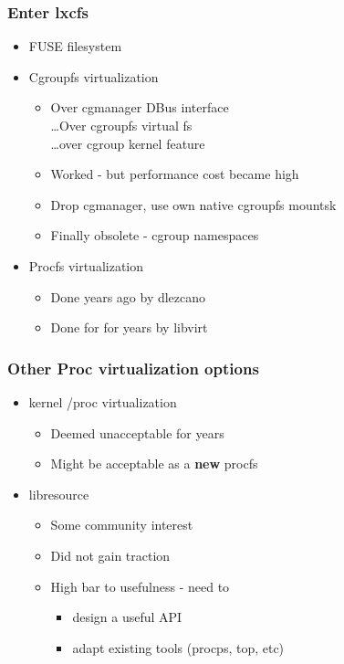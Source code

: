 \documentclass{beamer}
\begin{document}
\begin{frame}[fragile]
\frametitle{Enter lxcfs}
	\begin{itemize}
	\item FUSE filesystem
	\item Cgroupfs virtualization
		\begin{itemize}
		\item Over cgmanager DBus interface \\
			\ldots Over cgroupfs virtual fs \\
			\ldots over cgroup kernel feature
		\item Worked - but performance cost became high
		\pause
		\item Drop cgmanager, use own native cgroupfs mountsk
		\pause
		\item Finally obsolete - cgroup namespaces
		\end{itemize}
	\pause
	\item Procfs virtualization
		\begin{itemize}
		\item Done years ago by dlezcano
		\item Done for for years by libvirt
		\end{itemize}
	\end{itemize}
\end{frame}

\begin{frame}
\frametitle{Other Proc virtualization options}
\begin{itemize}
\item kernel /proc virtualization
	\begin{itemize}
	\item Deemed unacceptable for years
	\item Might be acceptable as a {\bf new} procfs
	\end{itemize}
\item libresource
	\begin{itemize}
	\item Some community interest
	\item Did not gain traction
	\item High bar to usefulness - need to
		\begin{itemize}
		\item design a useful API
		\item adapt existing tools (procps, top, etc)
		\end{itemize}
	\end{itemize}
\end{itemize}
\end{frame}
\end{document}
